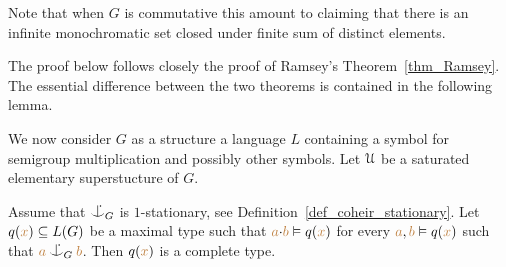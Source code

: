 \documentclass[creche.tex]{subfiles}
\begin{document}
Note that when $G$ is commutative this amount to claiming that there is an infinite monochromatic set closed under finite sum of distinct elements.

The proof below follows closely the proof of Ramsey's Theorem~\ref{thm_Ramsey}.
The essential difference between the two theorems is contained in the following lemma.

We now consider $G$ as a structure a language $L$ containing a symbol for semigroup multiplication and possibly other symbols.
Let $\EuScript U$ be a saturated elementary superstucture of $G$.

\begin{lemma}\label{lem_Hindman}
Assume that $\nonforkc_G$ is $1$-stationary, see Definition~\ref{def_coheir_stationary}.
Let $q({\color{brown} x})\subseteq L(G)$ be a maximal type such that ${\color{brown} a}{\cdot}{\color{brown} b}\vDash q({\color{brown} x})$ for every ${\color{brown} a},{\color{brown} b}\vDash q({\color{brown} x})$ such that ${\mr a}\nonforkc_G{\mr b}$.
Then $q({\color{brown} x})$ is a complete type.
\end{lemma}
\end{document}
